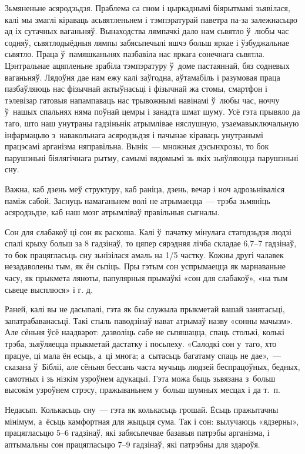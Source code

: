 Зьмяненьне асяродзьдзя. Праблема са сном і цыркаднымі біярытмамі зьявілася, калі мы змаглі кіраваць асьвятленьнем і тэмпэратурай паветра па-за залежнасьцю ад іх сутачных ваганьняў. Вынаходства лямпачкі дало нам сьвятло ў~любы час содняў, сьвятлодыёдныя лямпы забясьпечылі яшчэ больш яркае і ўзбуджальнае сьвятло. Праца ў~памяшканьнях пазбавіла нас яркага сонечнага сьвятла. Цэнтральнае ацяпленьне зрабіла тэмпэратуру ў~доме пастаяннай, бяз содневых ваганьняў. Лядоўня дае нам ежу калі заўгодна, аўтамабіль і разумовая праца пазбаўляюць нас фізычнай актыўнасьці і фізычнай жа стомы, смартфон і тэлевізар гатовыя напампаваць нас трывожнымі навінамі ў~любы час, ноччу ў~нашых спальнях няма поўнай цемры і занадта шмат шуму. Усё гэта прывяло да таго, што наш унутраны гадзіньнік атрымлівае няслушную, узаемавыключальную інфармацыю з~навакольнага асяродзьдзя і пачынае кіраваць унутранымі працэсамі арганізма няправільна. Вынік~--- множныя дэсынхрозы, то бок парушэньні біялягічнага рытму, самымі вядомымі зь якіх зьяўляюцца парушэньні сну.

Важна, каб дзень меў структуру, каб раніца, дзень, вечар і ноч адрозьніваліся паміж сабой. Заснуць намаганьнем волі не атрымаецца~--- трэба зьмяніць асяродзьдзе, каб наш мозг атрымліваў правільныя сыгналы.

Сон для слабакоў ці сон як раскоша. Калі ў~пачатку мінулага стагодзьдзя людзі спалі крыху больш за 8 гадзінаў, то цяпер сярэдняя лічба складае 6,7--7 гадзінаў, то бок працягласьць сну зьнізілася амаль на 1/5 частку. Кожны другі чалавек незадаволены тым, як ён сьпіць. Пры гэтым сон успрымаецца як марнаваньне часу, як прыкмета ляноты, папулярныя прымаўкі «сон для слабакоў», «на тым сьвеце высплюся» і г. д.

Раней, калі вы не дасыпалі, гэта як бы служыла прыкметай вашай занятасьці, запатрабаванасьці. Такі стыль паводзінаў нават атрымаў назву «сонны мачызм». Але сёньня ўсё наадварот: дазволіць сабе не сьпяшацца, спаць столькі, колькі трэба, зьяўляецца прыкметай дастатку і посьпеху. «Салодкі сон у~таго, хто працуе, ці мала ён есьць, а~ці многа; а~сытасьць багатаму спаць не дае»,~--- сказана ў~Бібліі, але сёньня бессань часта мучыць людзей беспрацоўных, бедных, самотных і зь нізкім узроўнем адукацыі. Гэта можа быць зьвязана з~больш высокім узроўнем стрэсу, пражываньнем у~больш шумных месцах і да т.~п.

Недасып. Колькасьць сну~--- гэта як колькасьць грошай. Ёсьць пражытачны мінімум, а~ёсьць камфортная для жыцьця сума. Так і сон: вылучаюць «ядзерны», працягласьцю 5--6 гадзінаў, які забясьпечвае базавыя патрэбы арганізма, і аптымальны сон працягласьцю 7--9 гадзінаў, які патрэбны для здароўя.

